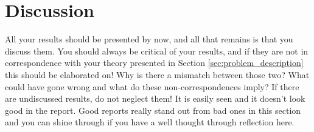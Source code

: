 \section{Discussion}
\label{sec:discussion}
All your results should be presented by now, and all that remains is that you discuss them. You should always be critical of your results, and if they are not in correspondence with your theory presented in Section \ref{sec:problem_description} this should be elaborated on! Why is there a mismatch between those two? What could have gone wrong and what do these non-correspondences imply? If there are undiscussed results, do not neglect them! It is easily seen and it doesn't look good in the report. Good reports really stand out from bad ones in this section and you can shine through if you have a well thought through reflection here.